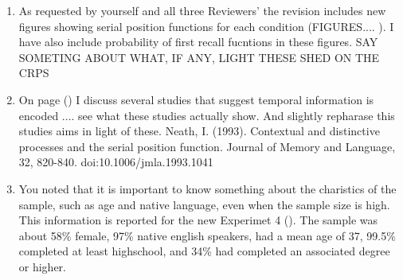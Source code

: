 \documentclass[12pt]{article}
\begin{document}
\begin{enumerate}
\item
	As requested by yourself and all three Reviewers' the revision includes new figures showing serial position functions for each condition (FIGURES.... \pageref{TODO-7}). I have also include probability of first recall fucntions in these figures. SAY SOMETING ABOUT WHAT, IF ANY, LIGHT THESE SHED ON THE CRPS

\item
	On page (\pageref{TODO-8}) I discuss several studies that suggest temporal information is encoded .... see what these studies actually show. And slightly repharase this studies aims in light of these.
	Neath, I. (1993). Contextual and distinctive processes and the serial position function. Journal of Memory and Language, 32, 820-840. doi:10.1006/jmla.1993.1041

\item
	You noted that it is important to know something about the charistics of the sample, such as age and native language, even when the sample size is high. This information is reported for the new Experimet 4 (\pageref{TODO-9}). The sample was about 58\% female, 97\% native english speakers, had a mean age of 37, 99.5\% completed at least highschool, and 34\% had completed an associated degree or higher. 


\end{enumerate}
\end{document}
